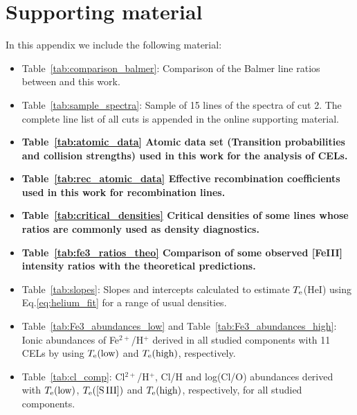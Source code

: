 \documentclass[fleqn,usenatbib]{mnras}
\begin{document}
\section{Supporting material}

In this appendix we include the following material:
\begin{itemize}
    
    \item Table~\ref{tab:comparison_balmer}: Comparison of the Balmer line ratios between \citet{Blagrave06} and this work.

    \item Table~\ref{tab:sample_spectra}: Sample of 15 lines of the spectra of cut 2. The complete line list of all cuts is appended in the online supporting material.
    
    \item {\bf Table~\ref{tab:atomic_data} Atomic data set (Transition probabilities and collision strengths) used in this work for the analysis of CELs.}
    
    \item {\bf Table~\ref{tab:rec_atomic_data} Effective recombination coefficients used in this work for recombination lines.}
    
    \item {\bf Table~\ref{tab:critical_densities} Critical densities of some lines whose ratios are commonly used as density diagnostics. }
    
    \item {\bf Table~\ref{tab:fe3_ratios_theo} Comparison of some observed [Fe\thinspace III] intensity ratios with the theoretical predictions.}

    \item Table~\ref{tab:slopes}: Slopes and intercepts calculated to estimate $T_{\rm e}$(He\thinspace I) using Eq.\eqref{eq:helium_fit} for a range of usual densities. 
    
    \item Table~\ref{tab:Fe3_abundances_low} and Table~\ref{tab:Fe3_abundances_high}: Ionic abundances of Fe$^{2+}$/H$^{+}$ derived in all studied components with 11 CELs by using $T_{\rm e} (\text{low})$ and $T_{\rm e} (\text{high})$, respectively.
    
    \item Table~\ref{tab:cl_comp}: Cl$^{2+}$/H$^{+}$, Cl/H and log(Cl/O) abundances derived with $T_{\rm e} (\text{low})$, $T_{\rm e} (\text{[S\thinspace III]})$ and $T_{\rm e} (\text{high})$, respectively, for all studied components.


\end{itemize}
\end{document}
